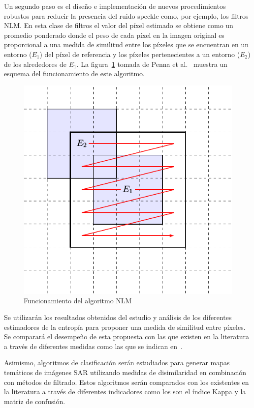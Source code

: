 \documentclass[11pt]{article}
\begin{document}
Un segundo paso es el diseño e implementación de nuevos procedimientos robustos para reducir la presencia del ruido speckle como, por ejemplo, los filtros NLM. En esta clase de filtros el valor del píxel estimado se obtiene como un promedio ponderado donde el peso de cada píxel en la imagen original es proporcional a una medida de similitud entre los píxeles que se encuentran en
un entorno ($E_1$) del píxel de referencia y los píxeles pertenecientes a un entorno ($E_2$) de los alrededores de $E_1$. La figura~\ref{NLM} tomada de Penna et al.~\cite{Penna2013} muestra un esquema del funcionamiento de este algoritmo. 

\begin{figure}[hbt]
	\label{NLM}
	\centering
	\includegraphics[scale=0.6]{../../Figures/Proyectos/UNGS2020/filtros.pdf}
	\caption{Funcionamiento del algoritmo NLM}
\end{figure}

Se utilizarán los resultados obtenidos del estudio y análisis de los diferentes estimadores de la entropía para proponer una medida de similitud entre píxeles. Se comparará el desempeño de esta propuesta con las que existen en la literatura a través de diferentes medidas como las que se indican en~\cite{Frery2019}.

Asimismo, algoritmos de clasificación serán estudiados para generar mapas temáticos de imágenes SAR utilizando medidas de disimilaridad en combinación con métodos de filtrado. Estos algoritmos serán comparados con los existentes en la literatura a través de diferentes indicadores como los son el índice Kappa y la matriz de confusión.
\end{document}
